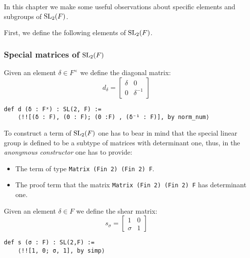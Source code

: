 In this chapter we make some useful observations about specific elements and subgroups of $\operatorname{SL}_2(F)$. 

First, we define the following elements of $\operatorname{SL}_2(F)$.

\subsubsection{Special matrices of $\operatorname{SL}_2(F)$}

\begin{definition}
\label{SpecialMatrices.d}
\leanok
    Given an element $\delta \in F^\times$ we define the diagonal matrix:
    \[
    d_\delta = \begin{bmatrix}
        \delta & 0\\
        0 & \delta^{-1}
    \end{bmatrix}
    \]
\end{definition}
\begin{footnotesize}
\begin{verbatim}
def d (δ : Fˣ) : SL(2, F) :=
    ⟨!![(δ : F), (0 : F); (0 :F) , (δ⁻¹ : F)], by norm_num⟩
\end{verbatim}
\end{footnotesize}

\begin{remark}
    To construct a term of $\operatorname{SL}_2(F)$ one has to bear in mind that the special linear group is defined to
    be a subtype of matrices with determinant one, thus, in the \textit{anonymous constructor}
    one has to provide:

    \begin{itemize}
        \item The term of type \texttt{Matrix (Fin 2) (Fin 2) F}.
        \item The proof term that the matrix \texttt{Matrix (Fin 2) (Fin 2) F} has determinant one.
    \end{itemize}
\end{remark}

\begin{definition}
\label{SpecialMatrices.s}
\leanok
    Given an element $\delta \in F$ we define the shear matrix:
    \[
    s_\sigma  = \begin{bmatrix}
    1 & 0\\
    \sigma & 1
    \end{bmatrix}
    \]
\end{definition}
\begin{footnotesize}
\begin{verbatim}
def s (σ : F) : SL(2,F) :=
    ⟨!![1, 0; σ, 1], by simp⟩
\end{verbatim}
\end{footnotesize}

